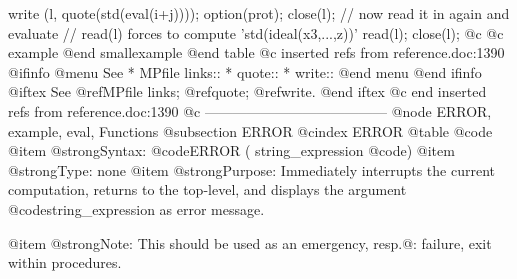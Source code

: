   write (l, quote(std(eval(i+j))));
  option(prot);
  close(l);
  // now read it in again and evaluate
  // read(l) forces to compute 'std(ideal(x3,...,z))'
  read(l);
  close(l);
@c @c example
@end smallexample
@end table
@c inserted refs from reference.doc:1390
@ifinfo
@menu
See
* MPfile links::
* quote::
* write::
@end menu
@end ifinfo
@iftex
See
@ref{MPfile links};
@ref{quote};
@ref{write}.
@end iftex
@c end inserted refs from reference.doc:1390
@c ---------------------------------------
@node ERROR, example, eval, Functions
@subsection ERROR
@cindex ERROR
@table @code
@item @strong{Syntax:}
@code{ERROR (} string_expression @code{)}
@item @strong{Type:}
none
@item @strong{Purpose:}
Immediately interrupts the current computation, returns to the
top-level, and displays the argument @code{string_expression} as error
message.

@item @strong{Note:}
This should be used as an emergency, resp.@: failure, exit within procedures.

